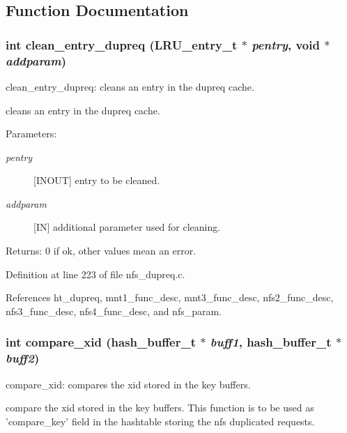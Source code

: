 \subsection{Function Documentation}
\subsubsection{\setlength{\rightskip}{0pt plus 5cm}int clean\_\-entry\_\-dupreq (LRU\_\-entry\_\-t $\ast$ {\em pentry}, void $\ast$ {\em addparam})}\label{nfs__dupreq_8c_a9}


clean\_\-entry\_\-dupreq: cleans an entry in the dupreq cache.

cleans an entry in the dupreq cache.

\begin{Desc}
\item[Parameters:]
\begin{description}
\item[{\em pentry}][INOUT] entry to be cleaned. \item[{\em addparam}][IN] additional parameter used for cleaning.\end{description}
\end{Desc}
\begin{Desc}
\item[Returns:]0 if ok, other values mean an error. \end{Desc}


Definition at line 223 of file nfs\_\-dupreq.c.

References ht\_\-dupreq, mnt1\_\-func\_\-desc, mnt3\_\-func\_\-desc, nfs2\_\-func\_\-desc, nfs3\_\-func\_\-desc, nfs4\_\-func\_\-desc, and nfs\_\-param.
\subsubsection{\setlength{\rightskip}{0pt plus 5cm}int compare\_\-xid (hash\_\-buffer\_\-t $\ast$ {\em buff1}, hash\_\-buffer\_\-t $\ast$ {\em buff2})}\label{nfs__dupreq_8c_a12}


compare\_\-xid: compares the xid stored in the key buffers.

compare the xid stored in the key buffers. This function is to be used as 'compare\_\-key' field in the hashtable storing the nfs duplicated requests.

